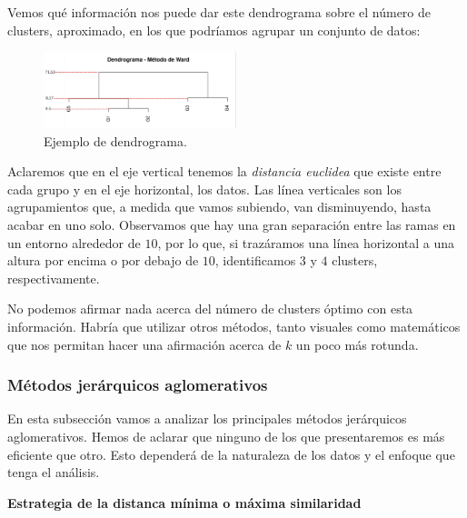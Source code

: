 \begin{ejemplo}

    Vemos qué información nos puede dar este dendrograma sobre el número de clusters, aproximado, en los que podríamos agrupar un conjunto de datos:

    \begin{figure}[h]
        \centering
        \includegraphics[width=0.5\textwidth]{../img/dendrograma.png}
        \caption{Ejemplo de dendrograma.}
    \end{figure}

    \FloatBarrier

    Aclaremos que en el eje vertical tenemos la \textit{distancia euclidea} que existe entre cada grupo y en el eje horizontal, los datos. Las línea verticales son los
    agrupamientos que, a medida que vamos subiendo, van disminuyendo, hasta acabar en uno solo. Observamos que hay una gran separación entre las ramas en un entorno alrededor
    de $10$, por lo que, si trazáramos una línea horizontal a una altura por encima o por debajo de $10$, identificamos $3$ y $4$ clusters, respectivamente. \newline

    No podemos afirmar nada acerca del número de clusters óptimo con esta información. Habría que utilizar otros métodos, tanto visuales como matemáticos que nos permitan
    hacer una afirmación acerca de $k$ un poco más rotunda.

\end{ejemplo}


\subsubsection{Métodos jerárquicos aglomerativos}  %

En esta subsección vamos a analizar los principales métodos jerárquicos aglomerativos. Hemos de aclarar que ninguno de los que presentaremos es más eficiente que otro. Esto 
dependerá de la naturaleza de los datos y el enfoque que tenga el análisis. \newline

\textbf{Estrategia de la distanca mínima o máxima similaridad} \newline

